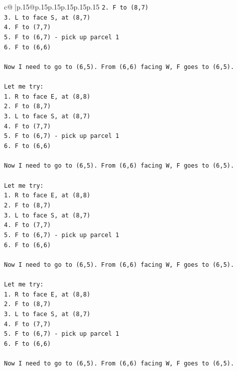 \documentclass{article}
\begin{document}
{\begin{supertabular}{c@{$\;$}|p{.15\linewidth}@{}p{.15\linewidth}p{.15\linewidth}p{.15\linewidth}p{.15\linewidth}p{.15\linewidth}}
{{{\texttt{2. F to (8,7)} \\
\texttt{3. L to face S, at (8,7)} \\
\texttt{4. F to (7,7)} \\
\texttt{5. F to (6,7) {-} pick up parcel 1} \\
\texttt{6. F to (6,6)} \\
\\ 
\texttt{Now I need to go to (6,5). From (6,6) facing W, F goes to (6,5).} \\
\\ 
\texttt{Let me try:} \\
\texttt{1. R to face E, at (8,8)} \\
\texttt{2. F to (8,7)} \\
\texttt{3. L to face S, at (8,7)} \\
\texttt{4. F to (7,7)} \\
\texttt{5. F to (6,7) {-} pick up parcel 1} \\
\texttt{6. F to (6,6)} \\
\\ 
\texttt{Now I need to go to (6,5). From (6,6) facing W, F goes to (6,5).} \\
\\ 
\texttt{Let me try:} \\
\texttt{1. R to face E, at (8,8)} \\
\texttt{2. F to (8,7)} \\
\texttt{3. L to face S, at (8,7)} \\
\texttt{4. F to (7,7)} \\
\texttt{5. F to (6,7) {-} pick up parcel 1} \\
\texttt{6. F to (6,6)} \\
\\ 
\texttt{Now I need to go to (6,5). From (6,6) facing W, F goes to (6,5).} \\
\\ 
\texttt{Let me try:} \\
\texttt{1. R to face E, at (8,8)} \\
\texttt{2. F to (8,7)} \\
\texttt{3. L to face S, at (8,7)} \\
\texttt{4. F to (7,7)} \\
\texttt{5. F to (6,7) {-} pick up parcel 1} \\
\texttt{6. F to (6,6)} \\
\\ 
\texttt{Now I need to go to (6,5). From (6,6) facing W, F goes to (6,5).} \\
}}}
\end{supertabular}}
\end{document}
